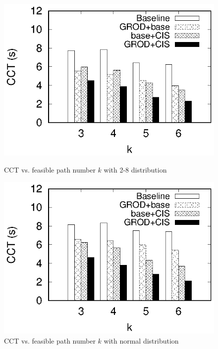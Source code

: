 \begin{figure}
\begin{minipage}[c]{0.23\textwidth}
\includegraphics[width=1\textwidth]{28_k_cct_histogram.eps}
\caption{CCT vs. feasible path number $k$ with 2-8 distribution$\qquad\qquad$}\label{fig:28_k_cct_histogram}
\end{minipage}
\hspace{1mm}
\begin{minipage}[c]{0.23\textwidth}
\centering

\includegraphics[width=1\textwidth]{normal_k_cct_histogram.eps}
\caption{CCT vs. feasible path number $k$ with normal distribution}\label{fig:normal_k_cct_histogram}
\end{minipage}
\vspace{0cm}
\begin{minipage}[c]{0.23\textwidth}
\centering


\end{minipage}
\end{figure}
